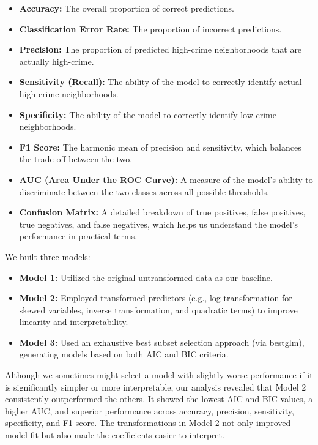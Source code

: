 \documentclass[
]{article}
\begin{document}
\begin{itemize}
\item
  \textbf{Accuracy:} The overall proportion of correct predictions.
\item
  \textbf{Classification Error Rate:} The proportion of incorrect
  predictions.
\item
  \textbf{Precision:} The proportion of predicted high-crime
  neighborhoods that are actually high-crime.
\item
  \textbf{Sensitivity (Recall):} The ability of the model to correctly
  identify actual high-crime neighborhoods.
\item
  \textbf{Specificity:} The ability of the model to correctly identify
  low-crime neighborhoods.
\item
  \textbf{F1 Score:} The harmonic mean of precision and sensitivity,
  which balances the trade-off between the two.
\item
  \textbf{AUC (Area Under the ROC Curve):} A measure of the model's
  ability to discriminate between the two classes across all possible
  thresholds.
\item
  \textbf{Confusion Matrix:} A detailed breakdown of true positives,
  false positives, true negatives, and false negatives, which helps us
  understand the model's performance in practical terms.
\end{itemize}

We built three models:

\begin{itemize}
\item
  \textbf{Model 1:} Utilized the original untransformed data as our
  baseline.
\item
  \textbf{Model 2:} Employed transformed predictors (e.g.,
  log-transformation for skewed variables, inverse transformation, and
  quadratic terms) to improve linearity and interpretability.
\item
  \textbf{Model 3:} Used an exhaustive best subset selection approach
  (via bestglm), generating models based on both AIC and BIC criteria.
\end{itemize}

Although we sometimes might select a model with slightly worse
performance if it is significantly simpler or more interpretable, our
analysis revealed that Model 2 consistently outperformed the others. It
showed the lowest AIC and BIC values, a higher AUC, and superior
performance across accuracy, precision, sensitivity, specificity, and F1
score. The transformations in Model 2 not only improved model fit but
also made the coefficients easier to interpret.
\end{document}
